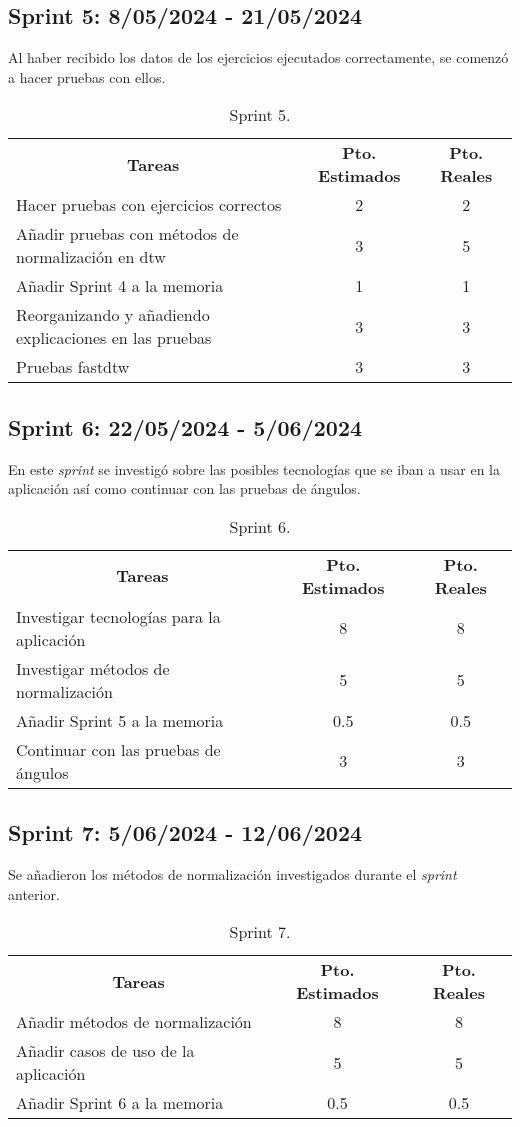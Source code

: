 \subsection{Sprint 5: 8/05/2024 - 21/05/2024 }
Al haber recibido los datos de los ejercicios ejecutados correctamente, se comenzó a hacer pruebas con ellos.
\begin{table}[H]
	\begin{tabular}{lcc}
	\multicolumn{1}{c}{\textbf{Tareas}} & \textbf{Pto. Estimados} & \textbf{Pto. Reales}\\
	    Hacer pruebas con ejercicios correctos & 2 & 2 \\
		Añadir pruebas con métodos de normalización en dtw & 3 & 5 \\
		Añadir Sprint 4 a la memoria & 1 &1 \\
		Reorganizando y añadiendo explicaciones en las pruebas & 3 & 3 \\
		Pruebas fastdtw & 3 & 3 \\
	\end{tabular}
	\caption{Sprint 5.}
	\label{sprint5}
\end{table}

\subsection{Sprint 6: 22/05/2024 - 5/06/2024 }
En este \textit{sprint} se investigó sobre las posibles tecnologías que se iban a usar en la aplicación así como continuar con las pruebas de ángulos.
\begin{table}[H]
	\begin{tabular}{lcc}
	\multicolumn{1}{c}{\textbf{Tareas}} & \textbf{Pto. Estimados} & \textbf{Pto. Reales}\\
		Investigar tecnologías para la aplicación & 8 & 8 \\
		Investigar métodos de normalización & 5 & 5 \\
		Añadir Sprint 5 a la memoria & 0.5 &0.5 \\
		Continuar con las pruebas de ángulos & 3 & 3 \\
	\end{tabular}
	\caption{Sprint 6.}
	\label{sprint6}
\end{table}

\subsection{Sprint 7: 5/06/2024 - 12/06/2024 }
Se añadieron los métodos de normalización investigados durante el \textit{sprint} anterior.
\begin{table}[h]
	\centering
	\begin{tabular}{lcc}
		\multicolumn{1}{c}{\textbf{Tareas}} & \textbf{Pto. Estimados} & \textbf{Pto. Reales}\\
		Añadir métodos de normalización & 8 & 8 \\
		Añadir casos de uso de la aplicación & 5 & 5 \\
		Añadir Sprint 6 a la memoria & 0.5 &0.5 \\
	\end{tabular}
	\caption{Sprint 7.}
	\label{sprint7}
\end{table}

